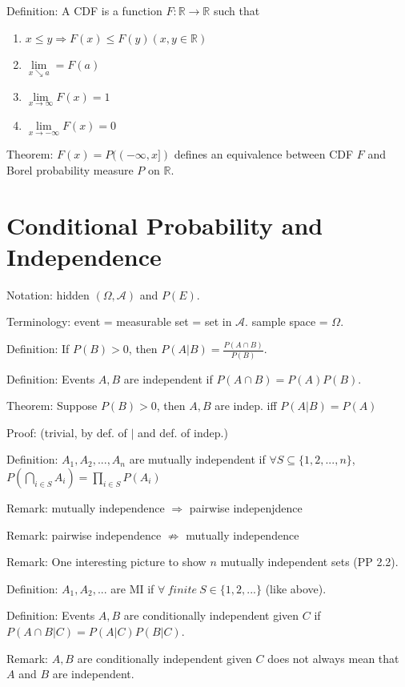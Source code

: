 \documentclass[12pt]{article}
\newcommand{\A}{\mathcal{A}}
\begin{document}
Definition: A CDF is a function $F:\mathbb{R}\rightarrow\mathbb{R}$ such that
\begin{enumerate}
    \item $x\le y \Rightarrow F(x)\le F(y) (x,y\in \mathbb{R})$
    \item $\lim\limits_{x\searrow a} = F(a)$
    \item $\lim\limits_{x\rightarrow \infty} F(x) = 1$
    \item $\lim\limits_{x\rightarrow -\infty} F(x)=0$
\end{enumerate}

Theorem: $F(x)=P((-\infty,x])$ defines an equivalence between CDF $F$ and Borel probability measure $P$ on
$\mathbb{R}$.


\section{Conditional Probability and Independence}

Notation: hidden $(\Omega,\A)$ and $P(E)$.

Terminology: event = measurable set = set in $\A$. sample space = $\Omega$. 
\bigbreak

Definition: If $P(B)>0$, then $P(A|B)=\frac{P(A\cap B)}{P(B)}$.
\bigbreak

Definition: Events $A, B$ are independent if $P(A\cap B) = P(A) P(B)$.
\bigbreak

Theorem: Suppose $P(B)>0$, then $A,B$ are indep. iff $P(A|B)=P(A)$

Proof: (trivial, by def. of $|$ and def. of indep.)
\bigbreak

Definition: $A_1,A_2,...,A_n$ are mutually independent if $\forall S\subseteq \{1,2,...,n\}$,
$P(\bigcap\limits_{i\in S} A_i) = \prod\limits_{i\in S} P(A_i)$

Remark: mutually independence $\Rightarrow$ pairwise indepenjdence

Remark: pairwise independence $\nRightarrow$ mutually independence

Remark: One interesting picture to show $n$ mutually independent sets (PP 2.2).
\bigbreak

Definition: $A_1, A_2,...$ are MI if $\forall\ finite\ S\in \{1,2,...\}$ (like above).
\bigbreak

Definition: Events $A,B$ are conditionally independent given $C$ if
$P(A\cap B | C) = P(A|C) P (B|C)$.

Remark: $A,B$ are conditionally independent given $C$ does not always mean that $A$ and $B$
are independent.
\bigbreak
\end{document}
